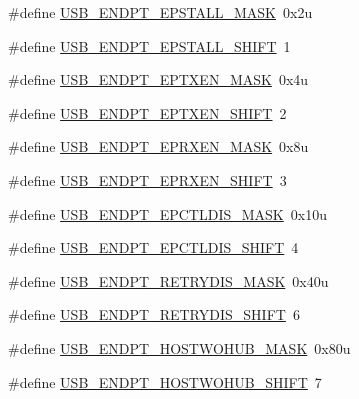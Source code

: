 \begin{DoxyCompactItemize}
\item 
\#define \hyperlink{group___u_s_b___register___masks_ga57a65ef14a5d868dcd964177fe6daad2}{U\+S\+B\+\_\+\+E\+N\+D\+P\+T\+\_\+\+E\+P\+S\+T\+A\+L\+L\+\_\+\+M\+A\+SK}~0x2u
\item 
\#define \hyperlink{group___u_s_b___register___masks_ga38af6f0d87e04be4f9f19cca981765cb}{U\+S\+B\+\_\+\+E\+N\+D\+P\+T\+\_\+\+E\+P\+S\+T\+A\+L\+L\+\_\+\+S\+H\+I\+FT}~1
\item 
\#define \hyperlink{group___u_s_b___register___masks_ga3d498f31497071c5ff6ad30e89b7c26e}{U\+S\+B\+\_\+\+E\+N\+D\+P\+T\+\_\+\+E\+P\+T\+X\+E\+N\+\_\+\+M\+A\+SK}~0x4u
\item 
\#define \hyperlink{group___u_s_b___register___masks_gad281aa3cd601a2a93f60e0145dd8e564}{U\+S\+B\+\_\+\+E\+N\+D\+P\+T\+\_\+\+E\+P\+T\+X\+E\+N\+\_\+\+S\+H\+I\+FT}~2
\item 
\#define \hyperlink{group___u_s_b___register___masks_ga80f33455bd11aa0be5cd5d876ab48228}{U\+S\+B\+\_\+\+E\+N\+D\+P\+T\+\_\+\+E\+P\+R\+X\+E\+N\+\_\+\+M\+A\+SK}~0x8u
\item 
\#define \hyperlink{group___u_s_b___register___masks_gaeba041e492aca9bfbdbc90584e00cba9}{U\+S\+B\+\_\+\+E\+N\+D\+P\+T\+\_\+\+E\+P\+R\+X\+E\+N\+\_\+\+S\+H\+I\+FT}~3
\item 
\#define \hyperlink{group___u_s_b___register___masks_ga07f43f2be7e974a763e86087f47e14d6}{U\+S\+B\+\_\+\+E\+N\+D\+P\+T\+\_\+\+E\+P\+C\+T\+L\+D\+I\+S\+\_\+\+M\+A\+SK}~0x10u
\item 
\#define \hyperlink{group___u_s_b___register___masks_ga0607b1ed419fd16c0c3635042ff33fd4}{U\+S\+B\+\_\+\+E\+N\+D\+P\+T\+\_\+\+E\+P\+C\+T\+L\+D\+I\+S\+\_\+\+S\+H\+I\+FT}~4
\item 
\#define \hyperlink{group___u_s_b___register___masks_ga116b045c1163bccc05a270beb6ee2f3d}{U\+S\+B\+\_\+\+E\+N\+D\+P\+T\+\_\+\+R\+E\+T\+R\+Y\+D\+I\+S\+\_\+\+M\+A\+SK}~0x40u
\item 
\#define \hyperlink{group___u_s_b___register___masks_ga7d07ae7b5369ee4cbfa19194ebc2e143}{U\+S\+B\+\_\+\+E\+N\+D\+P\+T\+\_\+\+R\+E\+T\+R\+Y\+D\+I\+S\+\_\+\+S\+H\+I\+FT}~6
\item 
\#define \hyperlink{group___u_s_b___register___masks_ga34644591d90c80611273ef5561529c34}{U\+S\+B\+\_\+\+E\+N\+D\+P\+T\+\_\+\+H\+O\+S\+T\+W\+O\+H\+U\+B\+\_\+\+M\+A\+SK}~0x80u
\item 
\#define \hyperlink{group___u_s_b___register___masks_ga3d502bcb3115f9bc7918b5fc67d42337}{U\+S\+B\+\_\+\+E\+N\+D\+P\+T\+\_\+\+H\+O\+S\+T\+W\+O\+H\+U\+B\+\_\+\+S\+H\+I\+FT}~7
\item 

\end{DoxyCompactItemize}

